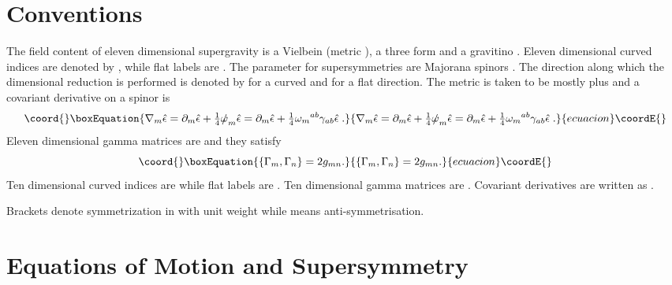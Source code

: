 \documentclass[a4paper,12pt]{article}
\providecommand{\ft}[2]{{\textstyle\frac{#1}{#2}}}
\begin{document}
\section{Conventions}\label{conventions}
The field content of eleven dimensional supergravity is a Vielbein \coordHE{} (metric \coordHE{}), a three form \coordHE{} and a gravitino \coordHE{}. Eleven dimensional curved indices are denoted by \coordHE{}, while flat labels are \coordHE{}. The parameter for supersymmetries are \coordHE{} Majorana spinors \myHighlight{$\hat{\epsilon}$}\coordHE{}. The direction along which the dimensional reduction is performed is denoted by \coordHE{} for a curved and \coordHE{} for a flat direction. The metric is taken to be mostly plus and a covariant derivative on a spinor is 
\begin{equation}\coord{}\boxEquation{
\nabla_m \hat{\epsilon}=\partial_m \hat{\epsilon}+\ft14 \slashed{\omega}_m \hat{\epsilon}=\partial_m \hat{\epsilon}+\ft14 \omega_m{}^{ab} \gamma_{ab} \hat{\epsilon}\; .
}{
\nabla_m \hat{\epsilon}=\partial_m \hat{\epsilon}+\ft14 \slashed{\omega}_m \hat{\epsilon}=\partial_m \hat{\epsilon}+\ft14 \omega_m{}^{ab} \gamma_{ab} \hat{\epsilon}\; .
}{ecuacion}\coordE{}\end{equation}
Eleven dimensional gamma matrices are \coordHE{} and they satisfy
\begin{equation}\coord{}\boxEquation{
\{ \Gamma_m , \Gamma_n \}=2g_{mn}.
}{
\{ \Gamma_m , \Gamma_n \}=2g_{mn}.
}{ecuacion}\coordE{}\end{equation}
Ten dimensional curved indices are \myHighlight{$\mu, \nu, \dots$}\coordHE{} while flat labels are \coordHE{}. Ten dimensional gamma matrices are \myHighlight{$\gamma^\mu$}\coordHE{}. Covariant derivatives are written as \coordHE{}. 

\noindent
Brackets \coordHE{} denote symmetrization in \coordHE{} with unit weight while \myHighlight{$[m,n]$}\coordHE{} means anti-symmetrisation.
\section{Equations of Motion and Supersymmetry} \label{theory}
\end{document}
